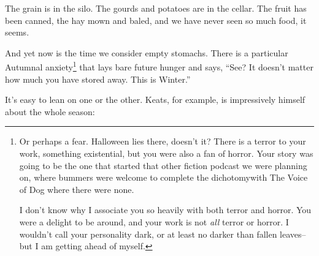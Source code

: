 \documentclass[12pt,oneside]{memoir}
\begin{document}
The grain is in the silo. The gourds and potatoes are in the cellar. The fruit has been canned, the hay mown and baled, and we have never seen so much food, it seems.

And yet now is the time we consider empty stomachs. There is a particular Autumnal anxiety\footnote{Or perhaps a fear. Halloween lies there, doesn't it? There is a terror to your work, something existential, but you were also a fan of horror. Your story was going to be the one that started that other fiction podcast we were planning on, where bummers were welcome to complete the dichotomy\footnotemark with The Voice of Dog where there were none.\par
I don't know why I associate you so heavily with both terror and horror. You were a delight to be around, and your work is not \emph{all} terror or horror. I wouldn't call your personality dark, or at least no darker than fallen leaves-- but I am getting ahead of myself.}
 that lays bare future hunger and says, ``See? It doesn't matter how much you have stored away. This is Winter.''

It's easy to lean on one or the other. Keats, for example, is impressively himself about the whole season:
\end{document}
